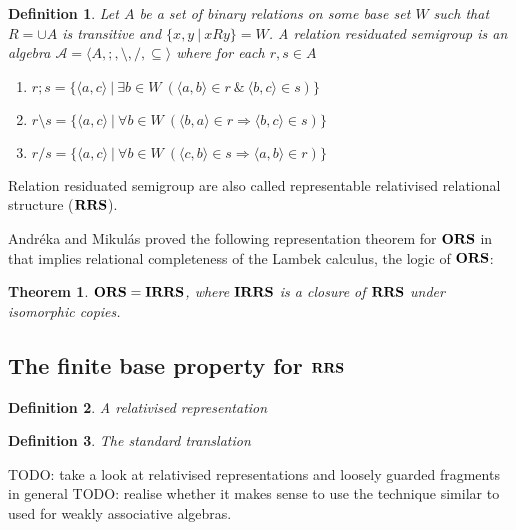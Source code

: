 \documentclass[a4paper]{article}
\theoremstyle{defin}
\newtheorem{defin}{Definition}
\theoremstyle{theorem}
\newtheorem{theorem}{Theorem}
\theoremstyle{prop}
\theoremstyle{lemma}
\theoremstyle{ex}
\theoremstyle{col}
\begin{document}
\begin{defin} \label{rrs}
  Let $A$ be a set of binary relations on some base set $W$ such that $R = \cup A$ is transitive and $\{ x, y \: | \: x R y \} = W$. A relation residuated semigroup is an algebra $\mathcal{A} = \langle A, ;, \setminus, /, \subseteq \rangle$ where for each $r, s \in A$
  \begin{enumerate}
    \item $r ; s = \{ \langle a, c \rangle \: | \: \exists b \in W \: (\langle a, b \rangle \in r \: \& \: \langle b, c \rangle \in s) \}$
    \item $r \setminus s = \{ \langle a, c \rangle \: | \: \forall b \in W \: (\langle b, a \rangle \in r \Rightarrow \langle b, c \rangle \in s)\}$
    \item $r / s = \{ \langle a, c \rangle \: | \: \forall b \in W \: (\langle c, b \rangle \in s \Rightarrow \langle a, b \rangle \in r)\}$
  \end{enumerate}
\end{defin}
Relation residuated semigroup are also called representable relativised relational structure (${\bf RRS}$).

Andr\'{e}ka and Mikul\'{a}s proved the following representation theorem for ${\bf ORS}$ in \cite{andreka1994lambek} that implies relational completeness of the Lambek calculus, the logic of ${\bf ORS}$:

\begin{theorem}\label{ors=irrs}
  ${\bf ORS} = {\bf IRRS}$, where ${\bf IRRS}$ is a closure of ${\bf RRS}$ under isomorphic copies.
\end{theorem}

\subsection{The finite base property for ${\bf RRS}$}

\begin{defin}
  A relativised representation
\end{defin}

\begin{defin}
  The standard translation
\end{defin}

TODO: take a look at relativised representations and loosely guarded fragments in general
TODO: realise whether it makes sense to use the technique similar to \cite[Theorem 19.13]{hirsch2002relation}
used for weakly associative algebras.
\end{document}
